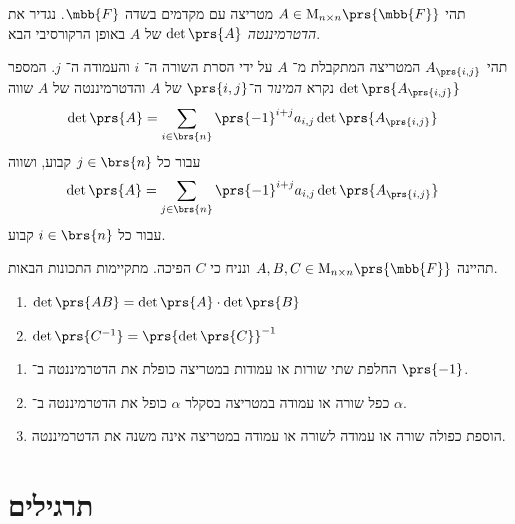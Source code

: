 \documentclass[a4paper,10pt,twoside,openany]{book}
\renewcommand{\Mat}{\mathrm{M}}
\begin{document}
\begin{definition}[דטרמיננטה]
תהי
$A \in \Mat_{n \times n}\prs{\mbb{F}}$
מטריצה עם מקדמים בשדה
$\mbb{F}$.
נגדיר את
\emph{הדטרמיננטה}
$\det\prs{A}$
של
$A$
באופן הרקורסיבי הבא.

תהי
$A_{\prs{i,j}}$
המטריצה המתקבלת מ־%
$A$
על ידי הסרת השורה ה־%
$i$
והעמודה ה־%
$j$.
המספר
$\det\prs{A_{\prs{i,j}}}$
נקרא
\emph{המינור}
ה־$\prs{i,j}$ של
$A$
והדטרמיננטה של
$A$
שווה
\begin{align*}
\det\prs{A} &= \sum_{i \in \brs{n}} \prs{-1}^{i+j} a_{i,j} \det\prs{A_{\prs{i,j}}}
\end{align*}
עבור כל
$j \in \brs{n}$
קבוע, ושווה
\begin{align*}
\det\prs{A} &= \sum_{j \in \brs{n}} \prs{-1}^{i+j} a_{i,j} \det\prs{A_{\prs{i,j}}}
\end{align*}
עבור כל
$i \in \brs{n}$
קבוע.
\end{definition}

\begin{theorem}
תהיינה
$A, B, C \in \Mat_{n \times n}\prs{\mbb{F}}$
ונניח כי
$C$
הפיכה.
מתקיימות התכונות הבאות.
\begin{enumerate}
\item $\det\prs{AB} = \det\prs{A} \cdot \det\prs{B}$
\item $\det\prs{C^{-1}} = \prs{\det\prs{C}}^{-1}$
\end{enumerate}
\end{theorem}

\begin{theorem}
\begin{enumerate}
\item החלפת שתי שורות או עמודות במטריצה כופלת את הדטרמיננטה ב־%
$\prs{-1}$.
\item כפל שורה או עמודה במטריצה בסקלר
$\alpha$
כופל את הדטרמיננטה ב־%
$\alpha$.
\item הוספת כפולה שורה או עמודה לשורה או עמודה במטריצה אינה משנה את הדטרמיננטה.
\end{enumerate}
\end{theorem}

\section{תרגילים}
\end{document}
